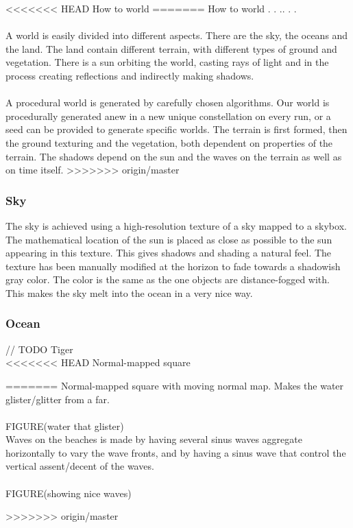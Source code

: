 <<<<<<< HEAD
How to world
=======
How to world . . .. . .\\
\\
A world is easily divided into different aspects. There are the sky, the oceans and the land. The land contain different terrain, with different types of ground and vegetation. There is a sun orbiting the world, casting rays of light and in the process creating reflections and indirectly making shadows.\\
\\
A procedural world is generated by carefully chosen algorithms. Our world is procedurally generated anew in a new unique constellation on every run, or a seed can be provided to generate specific worlds. The terrain is first formed, then the ground texturing and the vegetation, both dependent on properties of the terrain. The shadows depend on the sun and the waves on the terrain as well as on time itself.
>>>>>>> origin/master

\subsubsection{Sky}
The sky is achieved using a high-resolution texture of a sky mapped to a skybox. The mathematical location of the sun is placed as close as possible to the sun appearing in this texture. This gives shadows and shading a natural feel. The texture has been manually modified at the horizon to fade towards a shadowish gray color. The color is the same as the one objects are distance-fogged with. This makes the sky melt into the ocean in a very nice way. 

\subsubsection{Ocean}
// TODO  Tiger \\
<<<<<<< HEAD
Normal-mapped square

=======
Normal-mapped square with moving normal map. Makes the water glister/glitter from a far.\\\\
FIGURE(water that glister)
\\
Waves on the beaches is made by having several sinus waves aggregate horizontally to vary the wave fronts, and by having a sinus wave that control the vertical assent/decent of the waves.\\
\\
FIGURE(showing nice waves)

\newpage
>>>>>>> origin/master
